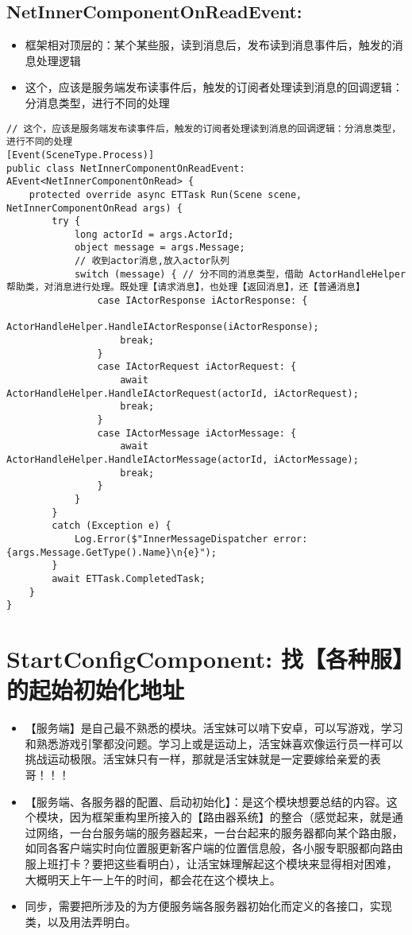 \documentclass[9pt, b5paper]{article}
\begin{document}
\subsection{NetInnerComponentOnReadEvent:}
\label{sec-7-18}
\begin{itemize}
\item 框架相对顶层的：某个某些服，读到消息后，发布读到消息事件后，触发的消息处理逻辑
\item 这个，应该是服务端发布读事件后，触发的订阅者处理读到消息的回调逻辑：分消息类型，进行不同的处理
\end{itemize}
\begin{verbatim}
// 这个，应该是服务端发布读事件后，触发的订阅者处理读到消息的回调逻辑：分消息类型，进行不同的处理
[Event(SceneType.Process)]
public class NetInnerComponentOnReadEvent: AEvent<NetInnerComponentOnRead> {
    protected override async ETTask Run(Scene scene, NetInnerComponentOnRead args) {
        try {
            long actorId = args.ActorId;
            object message = args.Message;
            // 收到actor消息,放入actor队列
            switch (message) { // 分不同的消息类型，借助 ActorHandleHelper 帮助类，对消息进行处理。既处理【请求消息】，也处理【返回消息】，还【普通消息】
                case IActorResponse iActorResponse: {
                    ActorHandleHelper.HandleIActorResponse(iActorResponse);
                    break;
                }
                case IActorRequest iActorRequest: {
                    await ActorHandleHelper.HandleIActorRequest(actorId, iActorRequest);
                    break;
                }
                case IActorMessage iActorMessage: {
                    await ActorHandleHelper.HandleIActorMessage(actorId, iActorMessage);
                    break;
                }
            }
        }
        catch (Exception e) {
            Log.Error($"InnerMessageDispatcher error: {args.Message.GetType().Name}\n{e}");
        }
        await ETTask.CompletedTask;
    }
}
\end{verbatim}

\section{StartConfigComponent: 找【各种服】的起始初始化地址}
\label{sec-8}
\begin{itemize}
\item 【服务端】是自己最不熟悉的模块。活宝妹可以啃下安卓，可以写游戏，学习和熟悉游戏引擎都没问题。学习上或是运动上，活宝妹喜欢像运行员一样可以挑战运动极限。活宝妹只有一样，那就是活宝妹就是一定要嫁给亲爱的表哥！！！
\item 【服务端、各服务器的配置、启动初始化】：是这个模块想要总结的内容。这个模块，因为框架重构里所接入的【路由器系统】的整合（感觉起来，就是通过网络，一台台服务端的服务器起来，一台台起来的服务器都向某个路由服，如同各客户端实时向位置服更新客户端的位置信息般，各小服专职服都向路由服上班打卡？要把这些看明白），让活宝妹理解起这个模块来显得相对困难，大概明天上午一上午的时间，都会花在这个模块上。
\item 同步，需要把所涉及的为方便服务端各服务器初始化而定义的各接口，实现类，以及用法弄明白。
\end{itemize}
\end{document}
